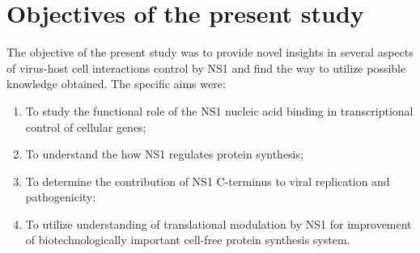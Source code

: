 \newpage
\section{Objectives of the present study}

The objective of the present study was to provide novel insights in several aspects of virus-host cell interactions control by NS1 and find the way to utilize possible knowledge obtained. The specific aims were:

	\begin{enumerate}
		\item To study the functional role of the NS1 nucleic acid binding in transcriptional control of cellular genes;
		
		\item To understand the how NS1 regulates protein synthesis;
		
		\item To determine the contribution of NS1 C-terminus to viral replication and pathogenicity;
		
		\item To utilize understanding of translational modulation by NS1 for improvement of biotechnologically important cell-free protein synthesis system.
		
	\end{enumerate}